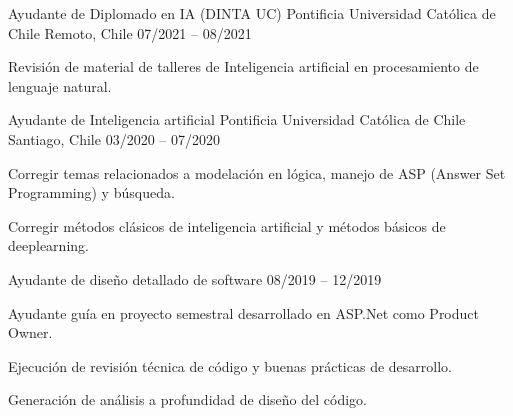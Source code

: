 

\begin{cventries}

\cventry
  {Ayudante de Diplomado en IA (DINTA UC)} %
  {Pontificia Universidad Católica de Chile} %
  {Remoto, Chile} %
  {07/2021 – 08/2021} %
  {
    \begin{cvitems} %
      \item {Revisión de material de talleres de Inteligencia artificial en procesamiento de lenguaje natural.}
    \end{cvitems}
  }
  \cventry
    {Ayudante de Inteligencia artificial} %
    {Pontificia Universidad Católica de Chile} %
    {Santiago, Chile} %
    {03/2020 – 07/2020} %
    {
      \begin{cvitems} %
        \item {Corregir temas relacionados a modelación en lógica, manejo de ASP (Answer Set Programming) y búsqueda.}
        \item {Corregir métodos clásicos de inteligencia artificial y métodos básicos de deeplearning.}
      \end{cvitems}
    }

  \cventry
    {Ayudante de diseño detallado de software} %
    {} %
    {} %
    {08/2019 – 12/2019} %
    {
      \begin{cvitems} %
        \item {Ayudante guía en proyecto semestral desarrollado en ASP.Net como Product Owner.}
        \item {Ejecución de revisión técnica de código y buenas prácticas de desarrollo.}
        \item {Generación de análisis a profundidad de diseño del código.}
      \end{cvitems}
    }


\end{cventries}
